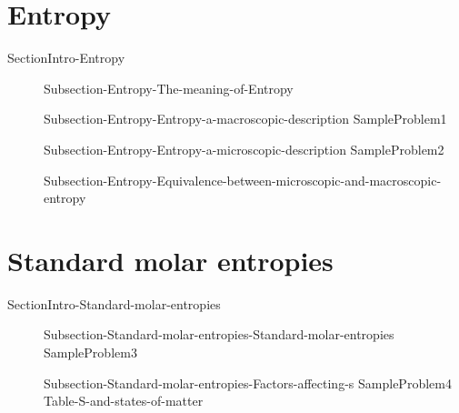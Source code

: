 \documentclass[main.tex]{subfiles}
\newcommand\chapterlabel{Ch-thermo}\setcounter{figurenewcounter}{0}\setcounter{tablenewcounter}{0}\setcounter{formulanewcounter}{0}\chapterpicture{../{\chapterlabel}/figure1}\chapterpicturelabel{PxFuel}
\begin{document}
\section{Entropy}
{SectionIntro-Entropy}
\sloppy\begin{description}
\item[]{Subsection-Entropy-The-meaning-of-Entropy}
\item[]{Subsection-Entropy-Entropy-a-macroscopic-description}
{SampleProblem1}
\item[]{Subsection-Entropy-Entropy-a-microscopic-description}
{SampleProblem2}
 \item[]{Subsection-Entropy-Equivalence-between-microscopic-and-macroscopic-entropy}

\end{description}

\section{Standard molar entropies}
{SectionIntro-Standard-molar-entropies}
\sloppy\begin{description}
\item[]{Subsection-Standard-molar-entropies-Standard-molar-entropies}
{SampleProblem3}
\item[]{Subsection-Standard-molar-entropies-Factors-affecting-s}
    {SampleProblem4}
    {Table-S-and-states-of-matter}
\end{description}
 
  
\end{document}
